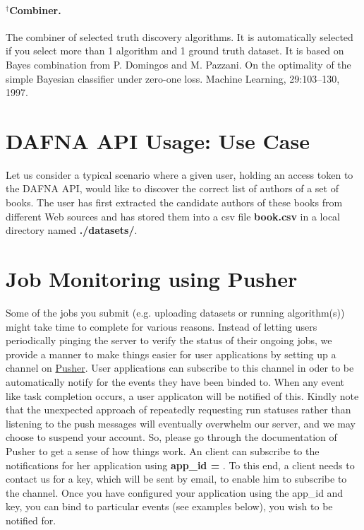 \documentclass[a4paper,10pt]{scrartcl}
\begin{document}
\paragraph*{$^{\dagger}$Combiner.}
The combiner of selected truth discovery algorithms. It is automatically selected if you select more than 1 algorithm and 1 ground truth dataset. It is based on Bayes combination from P. Domingos and M. Pazzani. On the optimality of the simple Bayesian classifier under zero-one loss. Machine Learning, 29:103–130, 1997.
\section{DAFNA API Usage: Use Case}
Let us consider a typical scenario where a given user, holding an access token \textbf{} to the DAFNA API, would 
like to discover the correct list of authors of a set of books. The user has first extracted the candidate authors of
these books from different Web sources and has stored them into a csv file \textbf{book.csv} in a local directory named \textbf{./datasets/}.
\section{Job Monitoring using Pusher}
Some of the jobs you submit (e.g. uploading datasets or running algorithm(s)) might take time to complete
for various reasons. Instead of letting users periodically pinging the server to verify the status of their
ongoing jobs, we provide a manner to make things easier for user applications by setting up a channel on \href{https://pusher.com/}{Pusher}.
User applications can subscribe to this channel in oder to be automatically notify for the events they have been binded to.
When any event like task completion occurs, a user applicaton will be notified of this. Kindly note that the unexpected
approach of repeatedly requesting run statuses rather than listening to the push messages will eventually overwhelm our 
server, and we may choose to suspend your account. So, please go through the documentation of Pusher to get a sense of how
things work. An client can subscribe to the notifications for her application using \textbf{app\_id = }.
To this end, a client needs to contact us for a key, which will be sent by email, to enable him to subscribe to the channel. Once you 
have configured your application using the app\_id and key, you can bind to particular events (see examples below), you wish to be notified for.
\end{document}

